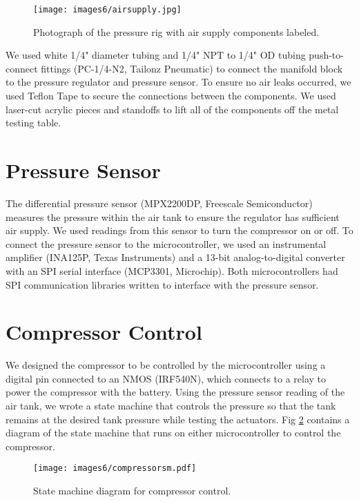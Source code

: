 \begin{figure}[!ht]
    \centering
    \texttt{[image: images6/airsupply.jpg]}
    \caption{Photograph of the pressure rig with air supply components labeled.}
    \label{fig:airsupply}
\end{figure}

We used white 1/4" diameter tubing and 1/4" NPT to 1/4" OD tubing push-to-connect fittings (PC-1/4-N2, Tailonz Pneumatic) to connect the manifold block to the pressure regulator and pressure sensor. To ensure no air leaks occurred, we used Teflon Tape to secure the connections between the components. We used laser-cut acrylic pieces and standoffs to lift all of the components off the metal testing table. 

\section{Pressure Sensor}

The differential pressure sensor (MPX2200DP, Freescale Semiconductor) measures the pressure within the air tank to ensure the regulator has sufficient air supply. We used readings from this sensor to turn the compressor on or off. To connect the pressure sensor to the microcontroller, we used an instrumental amplifier (INA125P, Texas Instruments) and a 13-bit analog-to-digital converter with an SPI serial interface (MCP3301, Microchip). Both microcontrollers had SPI communication libraries written to interface with the pressure sensor. 

\section{Compressor Control}

We designed the compressor to be controlled by the microcontroller using a digital pin connected to an NMOS (IRF540N), which connects to a relay to power the compressor with the battery. Using the pressure sensor reading of the air tank, we wrote a state machine that controls the pressure so that the tank remains at the desired tank pressure while testing the actuators. Fig \ref{fig:compressorsm} contains a diagram of the state machine that runs on either microcontroller to control the compressor. 

\begin{figure}[ht]
    \centering
    \texttt{[image: images6/compressorsm.pdf]}
    \caption{State machine diagram for compressor control.}
    \label{fig:compressorsm}
\end{figure}


